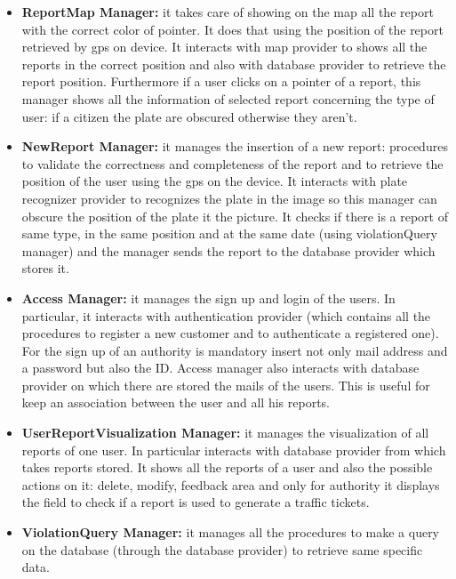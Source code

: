 \documentclass[../RASD.tex]{subfiles}
\begin{document}
    \begin{itemize}
        \item \textbf{ReportMap Manager:} it takes care of showing on the map all the report with the correct color of pointer.
        It does that using the position of the report retrieved by gps on device.
        It interacts with map provider to shows all the reports in the correct position and also with database provider to retrieve the report position.
        Furthermore if a user clicks on a pointer of a report, this manager shows all the information of selected report concerning the type of user:
        if a citizen the plate are obscured otherwise they aren’t.
        \item \textbf{NewReport Manager:} it manages the insertion of a new report: procedures to validate the correctness and completeness of the report
        and to retrieve the position of the user using the gps on the device.
        It interacts with plate recognizer provider to recognizes the plate in the image so this manager can obscure the position of the plate it the picture.
        It checks if there is a report of same type, in the same position and at the same date (using violationQuery manager)
        and the manager sends the report to the database provider which stores it.
        \item \textbf{Access Manager:} it manages the sign up and login of the users.
        In particular, it interacts with authentication provider (which contains all the procedures to register a new customer and to authenticate a registered one).
        For the sign up of an authority is mandatory insert not only mail address and a password but also the ID\@.
        Access manager also interacts with database provider on which there are stored the mails of the users.
        This is useful for keep an association between the user and all his reports.
        \item \textbf{UserReportVisualization Manager:} it manages the visualization of all reports of one user.
        In particular interacts with database provider from which takes reports stored.
        It shows all the reports of a user and also the possible actions on it: delete, modify, feedback area and only for authority
        it displays the field to check if a report is used to generate a traffic tickets.
        \item \textbf{ViolationQuery Manager:} it manages all the procedures to make a query on the database (through the database provider)
        to retrieve same specific data.

\end{itemize}
\end{document}
